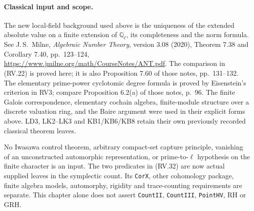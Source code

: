 \paragraph{Classical input and scope.}
The new local-field background used above is the uniqueness of the
extended absolute value on a finite extension of $\mathbb Q_\ell$,
its completeness and the norm formula.  See J.\,S.~Milne,
\emph{Algebraic Number Theory}, version 3.08 (2020),
Theorem 7.38 and Corollary 7.40, pp.~123--124,
\url{https://www.jmilne.org/math/CourseNotes/ANT.pdf}.
The comparison in (RV.22) is proved here; it is also Proposition
7.60 of those notes, pp.~131--132.
The elementary prime-power cyclotomic degree formula is proved
by Eisenstein's criterion in RV3; compare Proposition 6.2(a)
of those notes, p.~96.
The finite Galois correspondence, elementary cochain algebra,
finite-module structure over a discrete valuation ring, and the
Baire argument were used in their explicit forms above.
LD3, LK2--LK3 and KB1/KB6/KB8 retain their own previously recorded
classical theorem leaves.

No Iwasawa control theorem, arbitrary compact-set capture principle,
vanishing of an unconstructed automorphic representation, or
prime-to-$\ell$ hypothesis on the finite character is an input.
The two predicates in (RV.32) are now actual supplied leaves in
the symplectic count.  Its \texttt{CorX}, other cohomology package,
finite algebra models, automorphy, rigidity and trace-counting
requirements are separate.  This chapter alone does not assert
\texttt{CountII}, \texttt{CountIII}, \texttt{PointHV}, RH or GRH.
